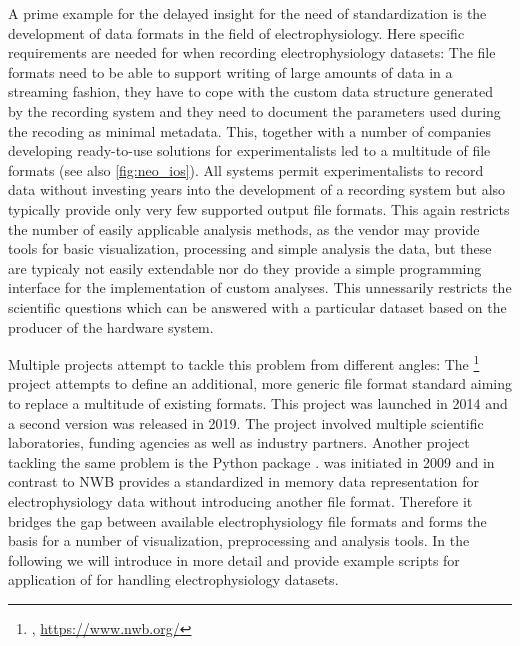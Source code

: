 A prime example for the delayed insight for the need of standardization is the development of data formats in the field of electrophysiology. Here specific requirements are needed for when recording electrophysiology datasets: The file formats need to be able to support writing of large amounts of data in a streaming fashion, they have to cope with the custom data structure generated by the recording system  and they need to document the parameters used during the recoding as minimal metadata. This, together with a number of companies developing ready-to-use solutions for experimentalists led to a multitude of file formats (see also \cref{fig:neo_ios}). All systems permit experimentalists to record data without investing years into the development of a recording system but also typically provide only very few supported output file formats. This again restricts the number of easily applicable analysis methods, as the vendor may provide tools for basic visualization, processing and simple analysis the data, but these are typicaly not easily extendable nor do they provide a simple programming interface for the implementation of custom analyses. This unnessarily restricts the scientific questions which can be answered with a particular dataset based on the producer of the hardware system.

Multiple projects attempt to tackle this problem from different angles: The \footnote{, \url{https://www.nwb.org/}} \citep{Teeters_2015} project attempts to define an additional, more generic file format standard aiming to replace a multitude of existing formats. This project was launched in 2014 and a second version was released in 2019. The project involved multiple scientific laboratories, funding agencies as well as industry partners.
Another project tackling the same problem is the Python package .  was initiated  in 2009 and in contrast to NWB provides a standardized in memory data representation for electrophysiology data without introducing another file format. Therefore it bridges the gap between available electrophysiology file formats and forms the basis for a number of visualization, preprocessing and analysis tools. In the following we will introduce  in more detail and provide example scripts for application of  for handling electrophysiology datasets.

